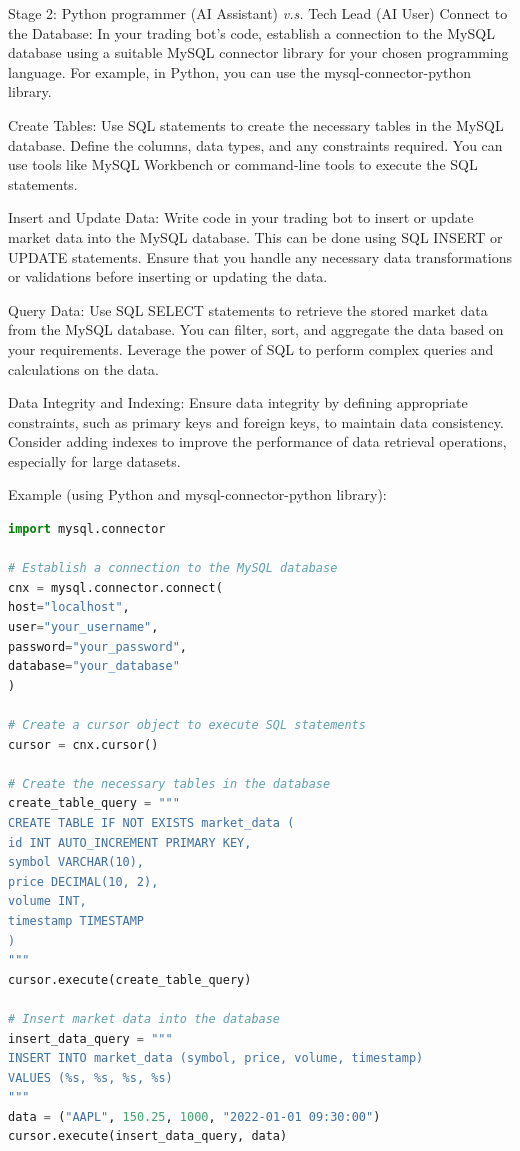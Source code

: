 \begin{AIBoxBreak}{Stage 2: Python programmer (AI Assistant) \textit{v.s.} Tech Lead (AI User)}
Connect to the Database: In your trading bot’s code, establish a connection to the MySQL database using a suitable MySQL connector library for your chosen programming language. For example, in Python, you can use the mysql-connector-python library.

Create Tables: Use SQL statements to create the necessary tables in the MySQL database. Define the columns, data types, and any constraints required. You can use tools like MySQL Workbench or command-line tools to execute the SQL statements.

Insert and Update Data: Write code in your trading bot to insert or update market data into the MySQL database. This can be done using SQL INSERT or UPDATE statements. Ensure that you handle any necessary data transformations or validations before inserting or updating the data.

Query Data: Use SQL SELECT statements to retrieve the stored market data from the MySQL database. You can filter, sort, and aggregate the data based on your requirements. Leverage the power of SQL to perform complex queries and calculations on the data.

Data Integrity and Indexing: Ensure data integrity by defining appropriate constraints, such as primary keys and foreign keys, to maintain data consistency. Consider adding indexes to improve the performance of data retrieval operations, especially for large datasets.

Example (using Python and mysql-connector-python library):

\begin{lstlisting}[language=Python]
import mysql.connector

# Establish a connection to the MySQL database
cnx = mysql.connector.connect(
host="localhost",
user="your_username",
password="your_password",
database="your_database"
)

# Create a cursor object to execute SQL statements
cursor = cnx.cursor()

# Create the necessary tables in the database
create_table_query = """
CREATE TABLE IF NOT EXISTS market_data (
id INT AUTO_INCREMENT PRIMARY KEY,
symbol VARCHAR(10),
price DECIMAL(10, 2),
volume INT,
timestamp TIMESTAMP
)
"""
cursor.execute(create_table_query)

# Insert market data into the database
insert_data_query = """
INSERT INTO market_data (symbol, price, volume, timestamp)
VALUES (%s, %s, %s, %s)
"""
data = ("AAPL", 150.25, 1000, "2022-01-01 09:30:00")
cursor.execute(insert_data_query, data)


\end{lstlisting}
\end{AIBoxBreak}
